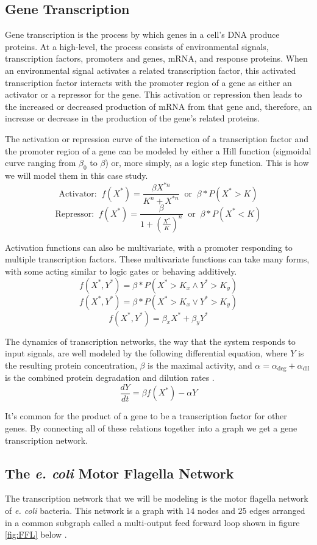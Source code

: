 \documentclass[12pt]{article}
\begin{document}
\subsection*{Gene Transcription}
Gene transcription is the process by which genes in a cell's DNA produce proteins.
At a high-level, the process consists of environmental signals, transcription factors, promoters and genes, mRNA, and response proteins.
When an environmental signal activates a related transcription factor, this activated transcription factor interacts with the promoter region of a gene as either an activator or a repressor for the gene.
This activation or repression then leads to the increased or decreased production of mRNA from that gene and, therefore, an increase or decrease in the production of the gene's related proteins.

The activation or repression curve of the interaction of a transcription factor and the promoter region of a gene can be modeled by either a Hill function (sigmoidal curve ranging from $\beta_0$ to $\beta$) or, more simply, as a logic step function.
This is how we will model them in this case study.
$$\text{Activator: } \ f(X^*)=\frac{\beta X^{*n}}{K^n + X^{*n}} \ \text{ or } \ \beta * P(X^* > K)$$
$$\text{Repressor: } \ f(X^*)=\frac{\beta}{1 + \left(\frac{X^*}{K}\right)^n} \ \text{ or } \ \beta * P(X^* < K)$$

Activation functions can also be multivariate, with a promoter responding to multiple transcription factors.
These multivariate functions can take many forms, with some acting similar to logic gates or behaving additively.
$$f(X^*, Y^*)=\beta*P(X^* > K_x \land Y^* > K_y)$$
$$f(X^*, Y^*)=\beta*P(X^* > K_x \lor Y^* > K_y)$$
$$f(X^*, Y^*)=\beta_x X^* + \beta_y Y^*$$

The dynamics of transcription networks, the way that the system responds to input signals, are well modeled by the following differential equation, where $Y$ is the resulting protein concentration, $\beta$ is the maximal activity, and $\alpha=\alpha_{\text{deg}} + \alpha_{\text{dil}}$ is the combined protein degradation and dilution rates \cite{alon2019introduction}.
$$\frac{dY}{dt}=\beta f(X^*) - \alpha Y$$

It's common for the product of a gene to be a transcription factor for other genes.
By connecting all of these relations together into a graph we get a gene transcription network.



\subsection*{The \textit{e. coli} Motor Flagella Network}
The transcription network that we will be modeling is the motor flagella network of \textit{e. coli} bacteria.
This network is a graph with $14$ nodes and $25$ edges arranged in a common subgraph called a multi-output feed forward loop shown in figure \ref{fig:FFL} below \cite{alon2019introduction}.
\end{document}
